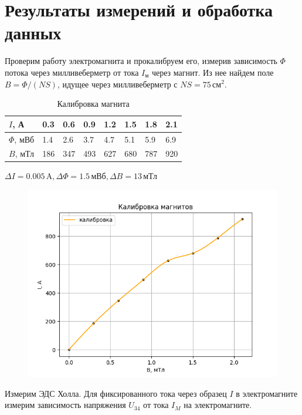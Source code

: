 \documentclass[a4paper, 10pt, twocolumn]{article}
\begin{document}
\section{Результаты измерений и обработка данных}
    Проверим работу электромагнита и прокалибруем его, измерив зависимость $\Phi$ потока через милливеберметр от тока $I_\text{м}$ через магнит. Из нее найдем поле $B = \Phi / (NS)$, идущее через милливеберметр с $NS = 75\,\text{см}^2$.

    \begin{table}[H]
        \centering
        \begin{tabular}{|l|l|l|l|l|l|l|l|} \hline
        $I$, А & 0.3 & 0.6 & 0.9 & 1.2 & 1.5 & 1.8 & 2.1 \\ \hline
        $\Phi$, мВб & 1.4 & 2.6 & 3.7 & 4.7 & 5.1 & 5.9 & 6.9 \\ \hline
        $B$, мТл & 186 & 347 & 493 & 627 & 680 & 787 & 920 \\ \hline
        \end{tabular}
        \caption{Калибровка магнита}
    \end{table}
    $\Delta I=0.005\,\text{A}, \Delta \Phi=1.5\,\text{мВб}, \Delta B=13\,\text{мТл}$

    \begin{figure}[H]
        \centering
        \includegraphics[width=1\linewidth]{graphs/figure1.png}
    \end{figure}

    Измерим ЭДС Холла. Для фиксированного тока через образец $I$ в электромагните измерим зависимость напряжения $U_{34}$ от тока $I_M$ на электромагните.
\end{document}
